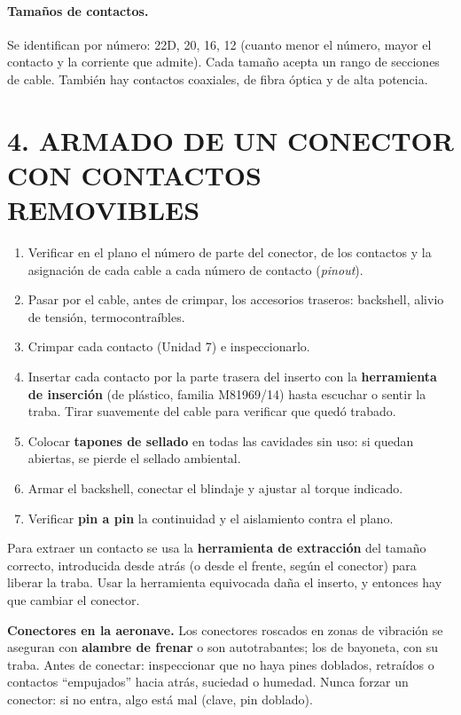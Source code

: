 \paragraph*{Tamaños de contactos.} Se identifican por número: 22D, 20, 16, 12 (cuanto menor el
número, mayor el contacto y la corriente que admite). Cada tamaño acepta un rango de secciones de
cable. También hay contactos coaxiales, de fibra óptica y de alta potencia.

\section*{4. ARMADO DE UN CONECTOR CON CONTACTOS REMOVIBLES}
\begin{enumerate}
  \item Verificar en el plano el número de parte del conector, de los contactos y la asignación de
        cada cable a cada número de contacto (\textit{pinout}).
  \item Pasar por el cable, antes de crimpar, los accesorios traseros: backshell, alivio de
        tensión, termocontraíbles.
  \item Crimpar cada contacto (Unidad 7) e inspeccionarlo.
  \item Insertar cada contacto por la parte trasera del inserto con la \textbf{herramienta de
        inserción} (de plástico, familia M81969/14) hasta escuchar o sentir la traba. Tirar
        suavemente del cable para verificar que quedó trabado.
  \item Colocar \textbf{tapones de sellado} en todas las cavidades sin uso: si quedan abiertas, se
        pierde el sellado ambiental.
  \item Armar el backshell, conectar el blindaje y ajustar al torque indicado.
  \item Verificar \textbf{pin a pin} la continuidad y el aislamiento contra el plano.
\end{enumerate}
Para extraer un contacto se usa la \textbf{herramienta de extracción} del tamaño correcto,
introducida desde atrás (o desde el frente, según el conector) para liberar la traba. Usar la
herramienta equivocada daña el inserto, y entonces hay que cambiar el conector.

\begin{recuadro}
\textbf{Conectores en la aeronave.} Los conectores roscados en zonas de vibración se aseguran con
\textbf{alambre de frenar} o son autotrabantes; los de bayoneta, con su traba. Antes de conectar:
inspeccionar que no haya pines doblados, retraídos o contactos ``empujados'' hacia atrás, suciedad o
humedad. Nunca forzar un conector: si no entra, algo está mal (clave, pin doblado).
\end{recuadro}

